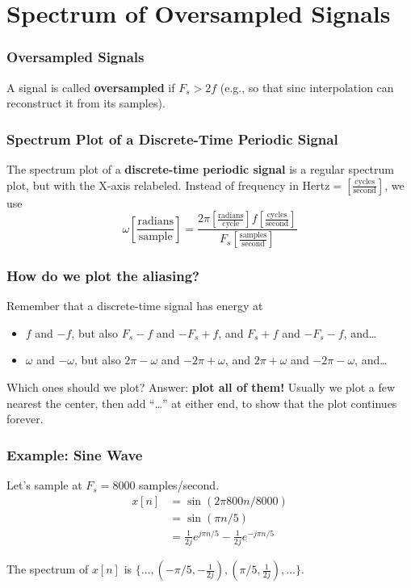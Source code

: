 \documentclass{beamer}
\begin{document}
\section[Oversampled]{Spectrum of Oversampled Signals}
\setcounter{subsection}{1}

\begin{frame}
  \frametitle{Oversampled Signals}

  A signal is called {\bf oversampled} if $F_s>2f$ (e.g., so that sinc
  interpolation can reconstruct it from its samples).
\end{frame}

\begin{frame}
  \frametitle{Spectrum Plot of a Discrete-Time Periodic Signal}

  The spectrum plot of a {\bf discrete-time periodic signal} is a
  regular spectrum plot, but with the X-axis relabeled.  Instead of
  frequency in Hertz$=\left[\frac{\mbox{cycles}}{\mbox{second}}\right]$, we use
    \begin{displaymath}
      \omega \left[\frac{\mbox{radians}}{\mbox{sample}}\right] =
      \frac{2\pi \left[\frac{\mbox{radians}}{\mbox{cycle}}\right]f\left[\frac{\mbox{cycles}}{\mbox{second}}\right]}{F_s\left[\frac{\mbox{samples}}{\mbox{second}}\right]}
    \end{displaymath}
\end{frame}

\begin{frame}
  \frametitle{How do we plot the aliasing?}

  Remember that a discrete-time signal has energy at
  \begin{itemize}
  \item $f$ and $-f$, but also $F_s-f$ and $-F_s+f$, and $F_s+f$ and $-F_s-f$, and\ldots
  \item $\omega$ and $-\omega$, but also $2\pi-\omega$ and $-2\pi+\omega$,
    and $2\pi+\omega$ and $-2\pi-\omega$, and\ldots
  \end{itemize}
  Which ones should we plot?  Answer: {\bf plot all of them!}  Usually
  we plot a few nearest the center, then add ``\ldots'' at either end,
  to show that the plot continues forever.
\end{frame}

\begin{frame}
  \frametitle{Example: Sine Wave}

  Let's sample at $F_s=8000$ samples/second.
  \begin{align*}
    x[n] &= \sin\left(2\pi 800n/8000\right)\\
    &= \sin\left(\pi n/5\right)\\
    &= \frac{1}{2j}e^{j\pi n/5} - \frac{1}{2j}e^{-j\pi n/5}
  \end{align*}

  The spectrum of $x[n]$ is $\{\ldots,(-\pi/5,-\frac{1}{2j}),(\pi/5,\frac{1}{2j}),\ldots\}$.
\end{frame}
\end{document}
